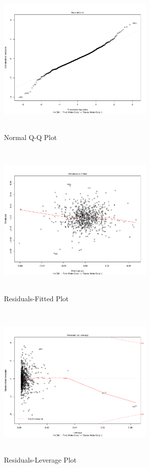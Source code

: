 \begin{figure}
\includegraphics[height=3in, width=3in]{qqplot}
\caption{Normal Q-Q Plot}
\end{figure}

\begin{figure}
\includegraphics[height=3in, width=3in]{residuals-fitted}
\caption{Residuals-Fitted Plot}
\end{figure}

\begin{figure}
\includegraphics[height=3in, width=3in]{residuals-leverage}
\caption{Residuals-Leverage Plot}
\end{figure}

